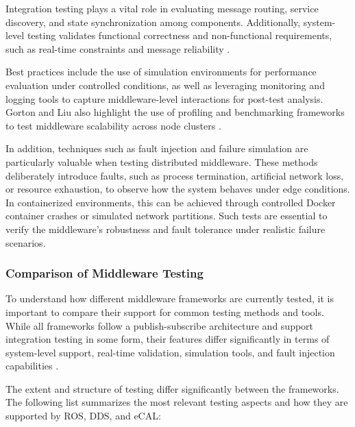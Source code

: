 \vspace{1em}
{Integration testing plays a vital role in evaluating message routing, service discovery, and state synchronization among components. Additionally, system-level testing validates functional correctness and non-functional requirements, such as real-time constraints and message reliability \cite{gorton2006software}.

\vspace{1em}
Best practices include the use of simulation environments for performance evaluation under controlled conditions, as well as leveraging monitoring and logging tools to capture middleware-level interactions for post-test analysis. Gorton and Liu also highlight the use of profiling and benchmarking frameworks to test middleware scalability across node clusters \cite{gorton2006software}.

\vspace{1em}
In addition, techniques such as fault injection and failure simulation are particularly valuable when testing distributed middleware. These methods deliberately introduce faults, such as process termination, artificial network loss, or resource exhaustion, to observe how the system behaves under edge conditions. In containerized environments, this can be achieved through controlled Docker container crashes or simulated network partitions. Such tests are essential to verify the middleware's robustness and fault tolerance under realistic failure scenarios.


\subsubsection{Comparison of Middleware Testing}

To understand how different middleware frameworks are currently tested, it is important to compare their support for common testing methods and tools. While all frameworks follow a publish-subscribe architecture and support integration testing in some form, their features differ significantly in terms of system-level support, real-time validation, simulation tools, and fault injection capabilities \cite{gorton2006software, burns2009real}.

\vspace{1em}
The extent and structure of testing differ significantly between the frameworks. The following list summarizes the most relevant testing aspects and how they are supported by ROS, DDS, and eCAL:

}
